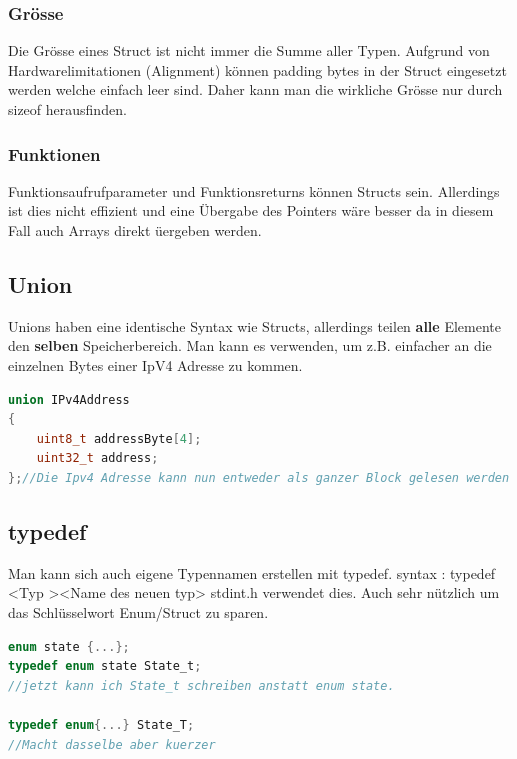 \subsubsection{Grösse}

Die Grösse eines Struct ist nicht immer die Summe aller Typen. Aufgrund von Hardwarelimitationen (Alignment) können padding bytes in der Struct eingesetzt werden welche einfach leer sind. Daher kann man die wirkliche Grösse nur durch sizeof herausfinden.

\subsubsection{Funktionen}

Funktionsaufrufparameter und Funktionsreturns können Structs sein. Allerdings ist dies nicht effizient und eine Übergabe des Pointers wäre besser da in diesem Fall auch Arrays direkt üergeben werden.

\subsection{Union}

Unions haben eine identische Syntax wie Structs, allerdings teilen \textbf{alle} Elemente den \textbf{selben} Speicherbereich. Man kann es verwenden, um z.B. einfacher an die einzelnen Bytes einer IpV4 Adresse zu kommen.
\begin{lstlisting}[language = c]
union IPv4Address
{
    uint8_t addressByte[4];
    uint32_t address;
};//Die Ipv4 Adresse kann nun entweder als ganzer Block gelesen werden oder die 4 bytes seperat. 
\end{lstlisting}

\subsection{typedef}

Man kann sich auch eigene Typennamen erstellen mit typedef.\newline
syntax : typedef \textless Typ \textgreater \textless Name des neuen typ\textgreater\newline
stdint.h verwendet dies. Auch sehr nützlich um das Schlüsselwort Enum/Struct zu sparen. 
\begin{lstlisting}[language = c]
enum state {...};
typedef enum state State_t;
//jetzt kann ich State_t schreiben anstatt enum state.

typedef enum{...} State_T;
//Macht dasselbe aber kuerzer
\end{lstlisting}